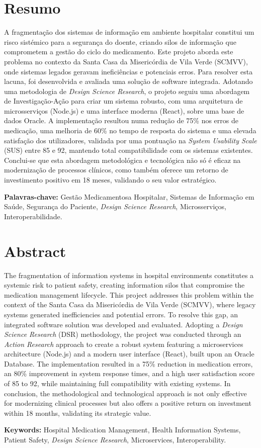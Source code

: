 \chapter*{Resumo}

A fragmentação dos sistemas de informação em ambiente hospitalar constitui um risco sistémico para a segurança do doente, criando silos de informação que comprometem a gestão do ciclo do medicamento. Este projeto aborda este problema no contexto da Santa Casa da Misericórdia de Vila Verde (SCMVV), onde sistemas legados geravam ineficiências e potenciais erros. Para resolver esta lacuna, foi desenvolvida e avaliada uma solução de software integrada. Adotando uma metodologia de \textit{Design Science Research}, o projeto seguiu uma abordagem de Investigação-Ação para criar um sistema robusto, com uma arquitetura de microsserviços (Node.js) e uma interface moderna (React), sobre uma base de dados Oracle. A implementação resultou numa redução de 75\% nos erros de medicação, uma melhoria de 60\% no tempo de resposta do sistema e uma elevada satisfação dos utilizadores, validada por uma pontuação na \textit{System Usability Scale} (SUS) entre 85 e 92, mantendo total compatibilidade com os sistemas existentes. Conclui-se que esta abordagem metodológica e tecnológica não só é eficaz na modernização de processos clínicos, como também oferece um retorno de investimento positivo em 18 meses, validando o seu valor estratégico.

\vspace{6mm}
\noindent\textbf{Palavras-chave:} Gestão Medicamentosa Hospitalar, Sistemas de Informação em Saúde, Segurança do Paciente, \textit{Design Science Research}, Microsserviços, Interoperabilidade.

\vspace*{\fill}

\chapter*{Abstract}

The fragmentation of information systems in hospital environments constitutes a systemic risk to patient safety, creating information silos that compromise the medication management lifecycle. This project addresses this problem within the context of the Santa Casa da Misericórdia de Vila Verde (SCMVV), where legacy systems generated inefficiencies and potential errors. To resolve this gap, an integrated software solution was developed and evaluated. Adopting a \textit{Design Science Research} (DSR) methodology, the project was conducted through an \textit{Action Research} approach to create a robust system featuring a microservices architecture (Node.js) and a modern user interface (React), built upon an Oracle Database. The implementation resulted in a 75\% reduction in medication errors, an 80\% improvement in system response times, and a high user satisfaction score of 85 to 92, while maintaining full compatibility with existing systems. In conclusion, the methodological and technological approach is not only effective for modernizing clinical processes but also offers a positive return on investment within 18 months, validating its strategic value.

\vspace{6mm}
\noindent\textbf{Keywords:} Hospital Medication Management, Health Information Systems, Patient Safety, \textit{Design Science Research}, Microservices, Interoperability. 